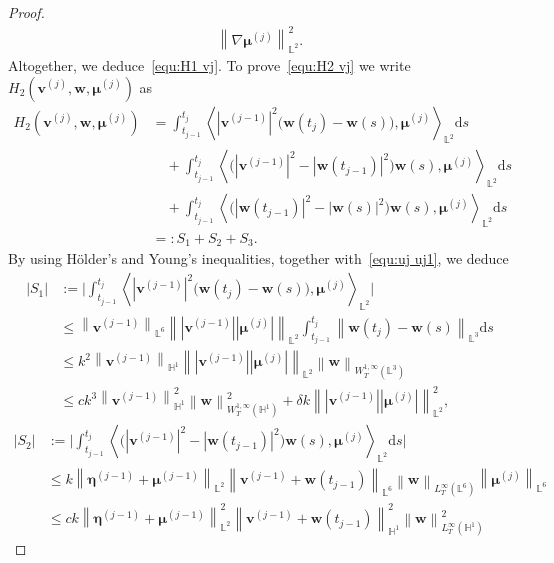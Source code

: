 \documentclass[10pt,a4paper]{amsart}
\newcommand{\bb}{\mathbb}
\newcommand{\bff}{\boldsymbol}
\newcommand{\ds}{\mathrm{d}s}
\newcommand{\inpro}[2]{\left\langle#1,#2\right\rangle}
\newcommand{\norm}[2]{\left\|{#1}\right\|_{#2}}
\begin{document}
\begin{proof}
\begin{align*}
			\norm{\nabla\bff{\mu}^{(j)}}{\bb{L}^2}^2.
	\end{align*}
	Altogether, we deduce~\eqref{equ:H1 vj}. To prove~\eqref{equ:H2 vj} we
	write~$H_2(\bff{v}^{(j)},\bff{w},\bff{\mu}^{(j)})$ as
	\begin{align*} 
		H_2(\bff{v}^{(j)},\bff{w},\bff{\mu}^{(j)})
		&=
		\int_{t_{j-1}}^{t_j} 
		\inpro{|\bff{v}^{(j-1)}|^2
			\big(\bff{w}(t_j)-\bff{w}(s)\big)}{\bff{\mu}^{(j)}}_{\bb{L}^2}
		\ds
		\\
		&\quad
		+
		\int_{t_{j-1}}^{t_j} 
		\inpro{\big( |\bff{v}^{(j-1)}|^2 - |\bff{w}(t_{j-1})|^2 \big)
			\bff{w}(s)}{\bff{\mu}^{(j)}}_{\bb{L}^2} \ds
		\\
		&\quad
		+
		\int_{t_{j-1}}^{t_j} 
		\inpro{\big( |\bff{w}(t_{j-1})|^2 - |\bff{w}(s)|^2 \big)
			\bff{w}(s)}{\bff{\mu}^{(j)}}_{\bb{L}^2} \ds
		\\
		&=: S_1 + S_2 + S_3.
	\end{align*}
	By using H\"older's and Young's inequalities, together
	with~\eqref{equ:uj uj1}, we deduce
	\begin{align*} 
		|S_1|
		&:=
		\Big|
		\int_{t_{j-1}}^{t_j} 
		\inpro{|\bff{v}^{(j-1)}|^2
			\big(\bff{w}(t_j)-\bff{w}(s)\big)}{\bff{\mu}^{(j)}}_{\bb{L}^2}
		\Big|
		\\
		&\le
		\norm{\bff{v}^{(j-1)}}{\bb{L}^6} 
		\norm{|\bff{v}^{(j-1)}||\bff{\mu}^{(j)}|}{\bb{L}^2} 
		\int_{t_{j-1}}^{t_j} 
		\norm{\bff{w}(t_j)-\bff{w}(s)}{\bb{L}^3} \ds
		\\
		&\le
		k^2
		\norm{\bff{v}^{(j-1)}}{\bb{H}^1} 
		\norm{|\bff{v}^{(j-1)}||\bff{\mu}^{(j)}|}{\bb{L}^2} 
		\norm{\bff{w}}{W^{1,\infty}_T(\bb{L}^3)} 
		\\
		&\le
		ck^3
		\norm{\bff{v}^{(j-1)}}{\bb{H}^1}^2
		\norm{\bff{w}}{W^{1,\infty}_T(\bb{H}^1)}^2
		+
		\delta k
		\norm{|\bff{v}^{(j-1)}||\bff{\mu}^{(j)}|}{\bb{L}^2}^2,
	\end{align*}
	\begin{align*} 
		|S_2|
		&:=
		\Big|
		\int_{t_{j-1}}^{t_j} 
		\inpro{\big( |\bff{v}^{(j-1)}|^2 - |\bff{w}(t_{j-1})|^2 \big)
			\bff{w}(s)}{\bff{\mu}^{(j)}}_{\bb{L}^2} \ds
		\Big|
		\\
		&\le
		k
		\norm{\bff{\eta}^{(j-1)}+\bff{\mu}^{(j-1)}}{\bb{L}^2}
		\norm{\bff{v}^{(j-1)}+\bff{w}(t_{j-1})}{\bb{L}^6}
		\norm{\bff{w}}{L^\infty_T(\bb{L}^6)} 
		\norm{\bff{\mu}^{(j)}}{\bb{L}^6}
		\\
		&\le
		ck
		\norm{\bff{\eta}^{(j-1)}+\bff{\mu}^{(j-1)}}{\bb{L}^2}^2
		\norm{\bff{v}^{(j-1)}+\bff{w}(t_{j-1})}{\bb{H}^1}^2
		\norm{\bff{w}}{L^\infty_T(\bb{H}^1)}^2

\end{align*}
\end{proof}
\end{document}
